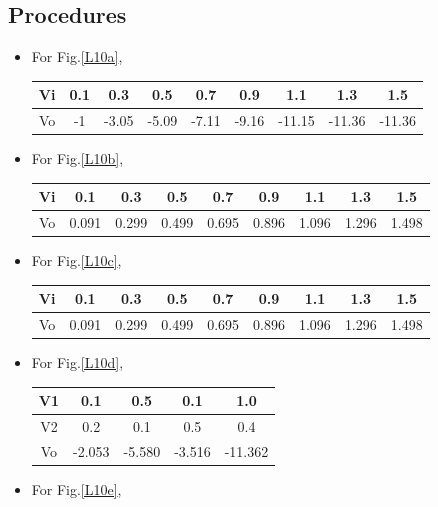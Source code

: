     \subsection{Procedures}
    \begin{itemize}
        \item For Fig.\ref{L10a},
\begin{table}[h]
\centering
\begin{tabular}{|c|c|c|c|c|c|c|c|c|}
\hline
Vi & 0.1 & 0.3   & 0.5   & 0.7   & 0.9   & 1.1    & 1.3    & 1.5    \\ \hline
Vo & -1  & -3.05 & -5.09 & -7.11 & -9.16 & -11.15 & -11.36 & -11.36 \\ \hline
\end{tabular}
\end{table}
\FloatBarrier
        \item For Fig.\ref{L10b},
\begin{table}[h]
\centering
\begin{tabular}{|c|c|c|c|c|c|c|c|c|}
\hline
Vi & 0.1   & 0.3   & 0.5   & 0.7   & 0.9   & 1.1   & 1.3   & 1.5   \\ \hline
Vo & 0.091 & 0.299 & 0.499 & 0.695 & 0.896 & 1.096 & 1.296 & 1.498 \\ \hline
\end{tabular}
\end{table}
\FloatBarrier
        \item For Fig.\ref{L10c},
\begin{table}[h]
\centering
\begin{tabular}{|c|c|c|c|c|c|c|c|c|}
\hline
Vi & 0.1   & 0.3   & 0.5   & 0.7   & 0.9   & 1.1   & 1.3   & 1.5   \\ \hline
Vo & 0.091 & 0.299 & 0.499 & 0.695 & 0.896 & 1.096 & 1.296 & 1.498 \\ \hline
\end{tabular}
\end{table}
\FloatBarrier
        \item For Fig.\ref{L10d},
\begin{table}[h]
\centering
\begin{tabular}{|c|c|c|c|c|}
\hline
V1 & 0.1    & 0.5    & 0.1    & 1.0     \\ \hline
V2 & 0.2    & 0.1    & 0.5    & 0.4     \\ \hline
Vo & -2.053 & -5.580 & -3.516 & -11.362 \\ \hline
\end{tabular}
\end{table}
\FloatBarrier
        \item For Fig.\ref{L10e},

\end{itemize}

